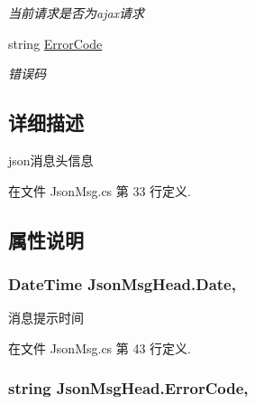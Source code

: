 \begin{DoxyCompactItemize}
\begin{DoxyCompactList}\small\item\em 当前请求是否为ajax请求 \end{DoxyCompactList}\item 
string \hyperlink{class_json_msg_head_ac82489c76531742bf5acba7af986b4eb}{Error\-Code}
\begin{DoxyCompactList}\small\item\em 错误码 \end{DoxyCompactList}\end{DoxyCompactItemize}


\subsection{详细描述}
json消息头信息 



在文件 Json\-Msg.\-cs 第 33 行定义.



\subsection{属性说明}
\hypertarget{class_json_msg_head_af78e10272141d88a221ab89bff532637}{
\subsubsection[{Date}]{\setlength{\rightskip}{0pt plus 5cm}Date\-Time Json\-Msg\-Head.\-Date\hspace{0.3cm}{\ttfamily [get]}, {\ttfamily [set]}}}\label{class_json_msg_head_af78e10272141d88a221ab89bff532637}


消息提示时间 



在文件 Json\-Msg.\-cs 第 43 行定义.

\hypertarget{class_json_msg_head_ac82489c76531742bf5acba7af986b4eb}{
\subsubsection[{Error\-Code}]{\setlength{\rightskip}{0pt plus 5cm}string Json\-Msg\-Head.\-Error\-Code\hspace{0.3cm}{\ttfamily [get]}, {\ttfamily [set]}}}\label{class_json_msg_head_ac82489c76531742bf5acba7af986b4eb}


